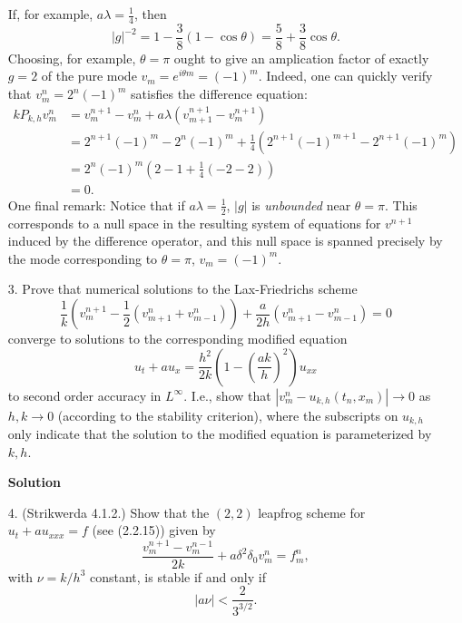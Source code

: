 \documentclass{article}
\providecommand{\abs}[1]{\left\lvert#1\right\rvert}
\begin{document}
\begin{itemize}
If, for example, $a \lambda = \frac{1}{4}$, then
\begin{equation*}
\abs{g}^{-2} = 1 - \frac{3}{8} \left( 1 - \cos \theta \right) = \frac{5}{8} + \frac{3}{8} \cos \theta.
\end{equation*}
Choosing, for example, $\theta = \pi$ ought to give an amplication factor of exactly $g = 2$ of the pure mode $v_m = e^{i \theta m} = (-1)^m$. Indeed, one can quickly verify that $v^n_m = 2^n (-1)^m$ satisfies the difference equation:
\begin{align*}
k P_{k,h} v^n_m
 & = v^{n+1}_m - v^n_m + a \lambda \left( v^{n+1}_{m+1} - v^{n+1}_m \right) \\
 & = 2^{n+1} (-1)^m - 2^n (-1)^m + \frac{1}{4} \left( 2^{n+1} (-1)^{m+1} - 2^{n+1} (-1)^m \right) \\
 & = 2^n (-1)^m \left( 2 - 1 + \frac{1}{4} \left( -2 -2 \right) \right) \\
 & = 0.
\end{align*}
One final remark: Notice that if $a \lambda = \frac{1}{2}$, $\abs{g}$ is \emph{unbounded} near $\theta = \pi$. This corresponds to a null space in the resulting system of equations for $v^{n+1}$ induced by the difference operator, and this null space is spanned precisely by the mode corresponding to $\theta = \pi$, $v_m = (-1)^m$.

\item[3.] Prove that numerical solutions to the Lax-Friedrichs scheme
\begin{equation*}
\frac{1}{k} \left( v^{n+1}_m - \frac{1}{2} \left( v^n_{m+1} + v^n_{m-1} \right) \right) + \frac{a}{2h} \left( v^n_{m+1} - v^n_{m-1} \right) = 0
\end{equation*}
converge to solutions to the corresponding modified equation
\begin{equation*}
u_t + a u_x = \frac{h^2}{2k} \left( 1 - \left( \frac{a k}{h} \right)^2 \right) u_{xx}
\end{equation*}
to second order accuracy in $L^{\infty}$. I.e., show that $\abs{v^n_m - u_{k,h} \left( t_n,x_m \right)} \to 0$ as $h,k \to 0$ (according to the stability criterion), where the subscripts on $u_{k,h}$ only indicate that the solution to the modified equation is parameterized by $k,h$.

\textbf{Solution}

\item[4.] (Strikwerda 4.1.2.) Show that the $(2,2)$ leapfrog scheme for $u_t + a u_{xxx} = f$ (see (2.2.15)) given by
\begin{equation*}
\frac{v^{n+1}_m - v^{n-1}_m}{2k} + a \delta^2 \delta_0 v^n_m = f^n_m,
\end{equation*}
with $\nu = k / h^3$ constant, is stable if and only if
\begin{equation*}
\abs{a \nu} < \frac{2}{3^{3/2}}.
\end{equation*}


\end{itemize}
\end{document}
